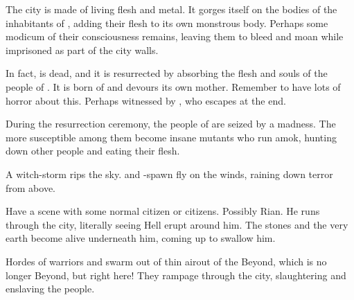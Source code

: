 The city is made of living flesh and metal. It gorges itself on the bodies of the inhabitants of \Malcur, adding their flesh to its own monstrous body. Perhaps some modicum of their consciousness remains, leaving them to bleed and moan while imprisoned as part of the city walls. 

In fact, \Nithdornazsh{} is dead, and it is resurrected by absorbing the flesh and souls of the people of \Malcur. It is born of \Malcur and devours its own mother. Remember to have lots of horror about this. Perhaps witnessed by \MoroCobrel, who escapes at the end. 

During the resurrection ceremony, the people of \Malcur are seized by a madness. The more susceptible among them become insane mutants who run amok, hunting down other people and eating their flesh. 

A witch-storm rips the sky. \Pdaemons{} and \dragon-spawn fly on the winds, raining down terror from above. 

Have a scene with some normal \Malcuric{} citizen or citizens. Possibly Rian. He runs through the city, literally seeing Hell erupt around him. The stones and the very earth become alive underneath him, coming up to swallow him. 

Hordes of warriors and \pdaemons{} swarm out of thin air\dash out of the Beyond, which is no longer Beyond, but right here! They rampage through the city, slaughtering and enslaving the people. 



